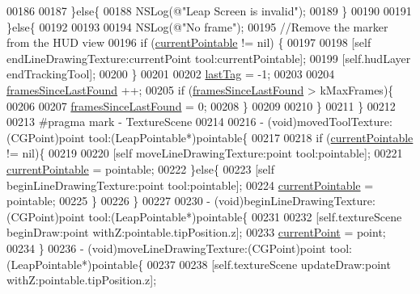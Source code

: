 \begin{DoxyCode}
{{00186             
00187         \}\textcolor{keywordflow}{else}\{
00188             NSLog(\textcolor{stringliteral}{@"Leap Screen is invalid"});
00189         \}
00190         
00191     \}\textcolor{keywordflow}{else}\{
00192         
00193         
00194         NSLog(\textcolor{stringliteral}{@"No frame"});
00195         \textcolor{comment}{//Remove the marker from the HUD view}
00196         \textcolor{keywordflow}{if} (\hyperlink{interface_game_manager_a9899e94be0e9364a59e5b76d5025d9f7}{currentPointable} != nil) \{
00197 
00198             [\textcolor{keyword}{self} endLineDrawingTexture:currentPoint tool:currentPointable];
00199             [\textcolor{keyword}{self}.hudLayer endTrackingTool];
00200         \}
00201         
00202         \hyperlink{interface_game_manager_a0b83b09829718f85c17d64f6ee06d441}{lastTag} = -1;
00203         
00204         \hyperlink{interface_game_manager_a546c4660d830a79c27bc2a51da00df12}{framesSinceLastFound} ++;
00205         \textcolor{keywordflow}{if} (\hyperlink{interface_game_manager_a546c4660d830a79c27bc2a51da00df12}{framesSinceLastFound} > kMaxFrames)\{
00206             
00207             \hyperlink{interface_game_manager_a546c4660d830a79c27bc2a51da00df12}{framesSinceLastFound} = 0;
00208         \}
00209         
00210     \}
00211 \}
00212 
00213 \textcolor{preprocessor}{#pragma mark - TextureScene}
00214 \textcolor{preprocessor}{}
00216 - (void)movedToolTexture:(CGPoint)point tool:(LeapPointable*)pointable\{
00217     
00218     \textcolor{keywordflow}{if} (\hyperlink{interface_game_manager_a9899e94be0e9364a59e5b76d5025d9f7}{currentPointable} != nil)\{
00219         
00220         [\textcolor{keyword}{self} moveLineDrawingTexture:point tool:pointable];
00221         \hyperlink{interface_game_manager_a9899e94be0e9364a59e5b76d5025d9f7}{currentPointable} = pointable;
00222     \}\textcolor{keywordflow}{else}\{
00223         [\textcolor{keyword}{self} beginLineDrawingTexture:point tool:pointable];
00224         \hyperlink{interface_game_manager_a9899e94be0e9364a59e5b76d5025d9f7}{currentPointable} = pointable;
00225     \}
00226 \}
00227 
00230 - (void)beginLineDrawingTexture:(CGPoint)point tool:(LeapPointable*)pointable\{
00231     
00232     [\textcolor{keyword}{self}.textureScene beginDraw:point withZ:pointable.tipPosition.z];
00233     \hyperlink{interface_game_manager_a880d3cc994cc208b57a97fac088c2781}{currentPoint} = point;
00234 \}
00236 - (void)moveLineDrawingTexture:(CGPoint)point tool:(LeapPointable*)pointable\{
00237     
00238     [\textcolor{keyword}{self}.textureScene updateDraw:point withZ:pointable.tipPosition.z];
}}
\end{DoxyCode}
